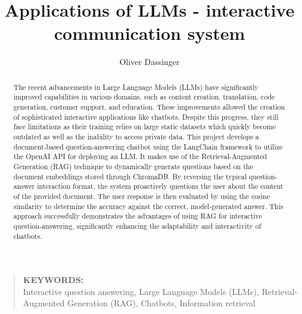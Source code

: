 \documentclass{article}
\begin{document}
\title{Applications of LLMs - interactive communication system}
\author{Oliver Dassinger}
\setlength{\affilsep}{0em}

\date{}

\maketitle

\begin{abstract}
\noindent The recent advancements in Large Language Models (LLMs) have significantly improved capabilities in various domains, such as content creation, translation, code generation, customer support, and education. These improvements allowed the creation of sophisticated interactive applications like chatbots. Despite this progress, they still face limitations as their training relies on large static datasets which quickly become outdated as well as the inability to access private data. This project develops a document-based question-answering chatbot using the LangChain framework to utilize the OpenAI API for deploying an LLM. It makes use of the Retrieval-Augmented Generation (RAG) technique to dynamically generate questions based on the document embeddings stored through ChromaDB. By reversing the typical question-answer interaction format, the system proactively questions the user about the content of the provided document. The user response is then evaluated by using the cosine similarity to determine the accuracy against the correct, model-generated answer. This approach successfully demonstrates the advantages of using RAG for interactive question-answering, significantly enhancing the adaptability and interactivity of chatbots. 
\end{abstract}
\begin{quote}
\textbf{KEYWORDS:}\\
Interactive question answering, Large Language Models (LLMs), Retrieval-Augmented Generation (RAG), Chatbots, Information retrieval
\end{quote}
\end{document}
